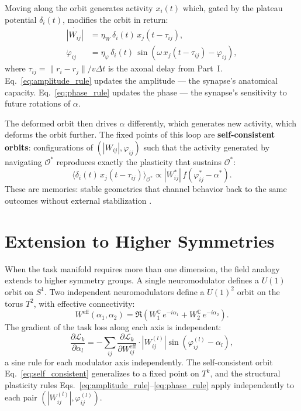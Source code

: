 \documentclass[11pt]{article}
\begin{document}
Moving along the orbit generates activity $x_i(t)$ which, gated
by the plateau potential $\delta_i(t)$, modifies the orbit in
return:
\begin{align}
\dot{|W_{ij}|} &= \eta_W\, \delta_i(t)\, x_j(t - \tau_{ij}),
\label{eq:amplitude_rule} \\
\dot{\varphi}_{ij} &= \eta_\varphi\, \delta_i(t)\,
\sin\!\left(\omega\, x_j(t - \tau_{ij}) - \varphi_{ij}\right),
\label{eq:phase_rule}
\end{align}
where $\tau_{ij} = \|r_i - r_j\|/v\Delta t$ is the axonal delay
from Part~I. Eq.~\eqref{eq:amplitude_rule} updates the
amplitude --- the synapse's anatomical capacity. 
Eq.~\eqref{eq:phase_rule} updates the phase --- the synapse's
sensitivity to future rotations of $\alpha$.

The deformed orbit then drives $\alpha$ differently, which
generates new activity, which deforms the orbit further.
The fixed points of this loop are \textbf{self-consistent orbits}:
configurations of $(|W_{ij}|, \varphi_{ij})$ such that the activity
generated by navigating $\mathcal{O}^*$ reproduces exactly the
plasticity that sustains $\mathcal{O}^*$:
\begin{equation}
\langle \delta_i(t)\, x_j(t - \tau_{ij})\rangle_{\mathcal{O}^*}
\propto |W_{ij}^*|\, f(\varphi_{ij}^* - \alpha^*).
\label{eq:self_consistent}
\end{equation}
These are memories: stable geometries that channel behavior back to
the same outcomes without external stabilization \citep{magee2026}.
\section{Extension to Higher Symmetries}

When the task manifold requires more than one dimension, the field
analogy extends to higher symmetry groups. A single neuromodulator
defines a $U(1)$ orbit on $S^1$. Two independent neuromodulators
define a $U(1)^2$ orbit on the torus $T^2$, with effective
connectivity:
\begin{equation}
W^{\text{eff}}(\alpha_1, \alpha_2) =
\Re\!\left(W^{\mathbb{C}}_1\, e^{-i\alpha_1} +
           W^{\mathbb{C}}_2\, e^{-i\alpha_2}\right).
\label{eq:u1k}
\end{equation}
The gradient of the task loss along each axis is independent:
\begin{equation}
\frac{\partial \mathcal{L}_k}{\partial \alpha_l} =
-\sum_{ij} \frac{\partial \mathcal{L}_k}{\partial W_{ij}^{\text{eff}}}
\cdot |W^{(l)}_{ij}|\sin(\varphi^{(l)}_{ij} - \alpha_l),
\label{eq:multi_sine}
\end{equation}
a sine rule for each modulator axis independently. The self-consistent
orbit Eq.~\eqref{eq:self_consistent} generalizes to a fixed point
on $T^k$, and the structural plasticity rules
Eqs.~\eqref{eq:amplitude_rule}--\eqref{eq:phase_rule} apply
independently to each pair $(|W^{(l)}_{ij}|, \varphi^{(l)}_{ij})$.
\end{document}
